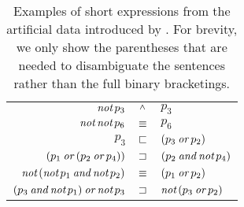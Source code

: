 \begin{table}[tp]
  \centering\small
    \begin{tabular}[t]{r c l}
      \toprule
      $\mathop{\textit{not}} p_3$        & $\mathbin{^{\wedge}}$ & $p_3$ \\
      $\mathop{\textit{not}} \mathop{\textit{not}} p_6$ & $\equiv$  & $p_6$ \\
      $p_3$               & $\sqsubset$ & $(p_3 \mathbin{\textit{or}} p_2)$ \\
      $(p_1 \mathbin{\textit{or}} (p_2 \mathbin{\textit{or}} p_4))$               & $\sqsupset$ & $(p_2 \mathbin{\textit{and}}  \mathop{\textit{not}} p_4)$ \\
      $\mathop{\textit{not}}\, (\mathop{\textit{not}} p_1 \mathbin{\textit{and}} \mathop{\textit{not}} p_2)$ & $\equiv$ & $(p_1 \mathbin{\textit{or}} p_2)$ \\ 
      $(p_3 \mathbin{\textit{and}} \mathop{\textit{not}} p_1 ) \mathbin{\textit{or}} \mathop{\textit{not}} p_3$    & $\sqsupset$& $\mathop{\textit{not}}\, (p_3 \mathbin{\textit{or}} p_2)$ \\
      \bottomrule
    \end{tabular}
    \caption{Examples of short expressions from the artificial data introduced by \protect\citealt{Bowman:Potts:Manning:2014}. For brevity, we only show the parentheses that are needed to disambiguate the sentences rather than the full binary bracketings.}\label{tab:plexs}
\end{table}

